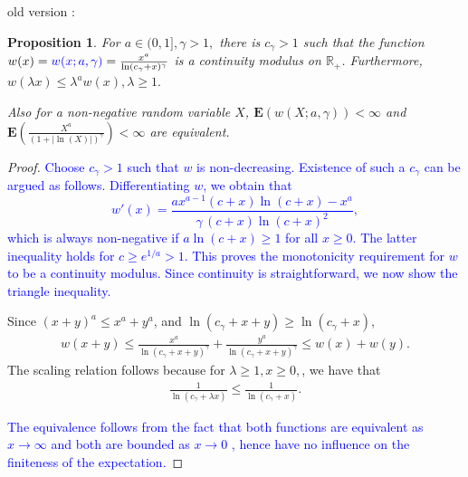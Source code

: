 \documentclass[12pt]{article}
\newtheorem{proposition}[theorem]{Proposition}
\newcommand{\1}{\mathbf{1}}
\newcommand{\blue}[1]{\textcolor{blue}{#1}}
\renewcommand{\footnote}[1]{}
\begin{document}
{{{{{{ {old version :}

\begin{proposition}
\label{p:cont_mod}
 { For $a\in (0,1],\gamma >1,$ there is $c_{\gamma }>1$ such that }the function $ w(x) = \blue{w(x;a,\gamma)} = \frac{ x^{a}}{  \ln( c_{\gamma}+x)^{ \gamma }}$  is a continuity modulus on $ \mathbb{R}_{ + }$. Furthermore, $ w(\lambda x)\leqslant \lambda ^{a}w(x),\lambda \geqslant 1.$

 {Also for a non-negative random variable $X$, $\mathbf{E}(w(X;a,\gamma))<\infty $ and $\mathbf{E}(\frac{X^{a}}{(1+|\ln(X)|)^{\gamma }})<\infty $ are equivalent.}
\end{proposition}
%
\begin{proof} \blue{Choose $c_{\gamma }>1$ such that $w$ is non-decreasing. Existence of such a $c_{\gamma}$ can be argued as follows. Differentiating $w$, we obtain that
%
$$ w'(x) = \frac{ax^{a-1}(c+x)\ln(c+x) - x^a}{\gamma \, (c+x) \ln(c+x)^2},$$
%
which is always non-negative if $a\ln(c+x) \geq 1$ for all $x \geq 0$. The latter inequality holds for $c \geq e^{1/a} > 1$. This proves the monotonicity requirement for $w$ to be a continuity modulus. Since continuity is straightforward, we now show the triangle inequality.}

Since $ (x+y)^{a}\leqslant x^{a}+y^{a}$, and $ \ln(c_{\gamma }+x+y)\geqslant \ln(c_{\gamma }+x)$,
\begin{align*}
w (x+y)\leqslant \frac{ x^{a}}{\ln(c_{\gamma }+x+y)^{ \gamma }}+\frac{ y^a}{\ln(c_{\gamma }+x+y)^{ \gamma }}\leqslant w (x)+w (y).
\end{align*}
The scaling relation follows because for $ \lambda \geqslant 1,x\geqslant 0,$, we have that
\begin{align*}
\frac{ 1}{\ln(c_{\gamma }+\lambda x)}\leqslant \frac{ 1}{\ln(c_{\gamma }+x)}.
\end{align*}


\blue{The equivalence follows from the fact that both functions are equivalent as $ x\to \infty $ and both are bounded as $ x\to 0$ \footnote{{both go to $0$ as $x \to 0$ and one goes faster than the other. This could have some impact no ?}}, hence have no influence on the finiteness of the expectation.}
\end{proof}
}

}}}}}
\end{document}
